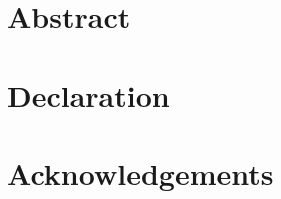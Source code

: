 \documentclass[11pt,twoside,openright,showframe]{report}
\begin{document}


\newpage  %
\setcounter{page}{2}

  \chapter*{Abstract} 
  \chapter*{Declaration} 
  \chapter*{Acknowledgements} 
\hTOCandLists
\clearpage

\end{document}
